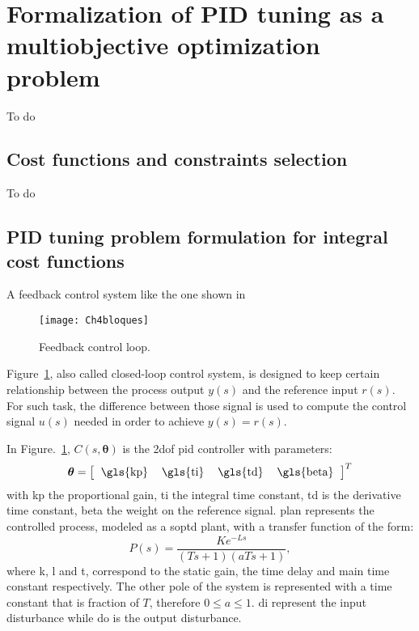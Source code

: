%
\section{Formalization of PID tuning as a multiobjective optimization problem}
\label{sec:FormPIDMOOP}
To do
\subsection{Cost functions and constraints selection}
\label{sec:CostFunSelec}
To do
\subsection{PID tuning problem formulation for integral cost functions}
\label{sec:CostProbPID}
A feedback control system like the one shown in %
\begin{figure}[tb]
	\centering
	\texttt{[image: Ch4bloques]}%
	\caption{Feedback control loop.}%
	\label{fig:bloques}%
\end{figure}
%
Figure~\ref{fig:bloques}, also called closed-loop control system, is designed to keep certain relationship between the process output $y(s)$ and the reference input $r(s)$. For such task, the difference between those signal is used to compute the control signal $u(s)$ needed in order to achieve $y(s)=r(s)$. 

In Figure.~\ref{fig:bloques}, $C(s,\bm{\theta})$ is the \gls{2dof} \gls{pid} controller with parameters:
\begin{equation*}
\bm{\theta}=\left[	\begin{tabular}{cccc} \gls{kp} & \gls{ti} & \gls{td} & \gls{beta}	\end{tabular}\right]^T
\end{equation*}
%
with \gls{kp} the proportional gain, \gls{ti} the integral time constant, \gls{td} is the derivative time constant, \gls{beta} the weight on the reference signal. \gls{plan} represents the controlled process, modeled as a \gls{soptd} plant, with a transfer function of the form:
\begin{equation}  %
P(s) =  \frac{K e^{-Ls}}{(T s+1)(a T s+1)},
\label{eq:plantaX}
\end{equation}
%
where \gls{k}, \gls{l} and \gls{t}, correspond to the static gain, the time delay and main time constant respectively. The other pole of the system is represented with a time constant that is fraction of $T$, therefore $0 \leq a \leq 1$. \gls{di} represent the input disturbance while \gls{do} is the output disturbance.

